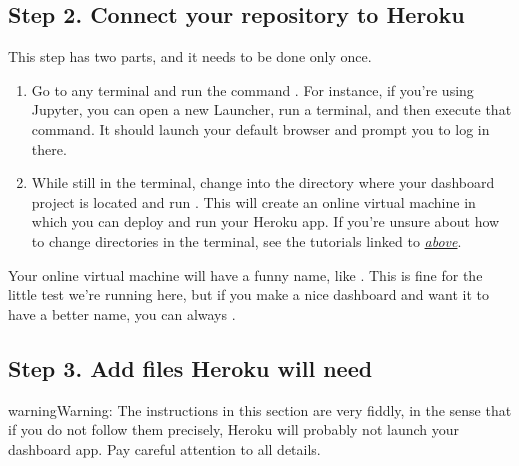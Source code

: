 \documentclass[letterpaper,10pt,english]{jupyterBook}
\begin{document}
\subsection{Step 2. Connect your repository to Heroku}
\label{\detokenize{chapter-14-dashboards:step-2-connect-your-repository-to-heroku}}
\sphinxAtStartPar
This step has two parts, and it needs to be done only once.
\begin{enumerate}
%
\item {} 
\sphinxAtStartPar
{}  Go to any terminal and run the command .  For instance, if you’re using Jupyter, you can open a new Launcher, run a terminal, and then execute that command.  It should launch your default browser and prompt you to log in there.

\item {} 
\sphinxAtStartPar
{}  While still in the terminal, change into the directory where your dashboard project is located and run .  This will create an online virtual machine in which you can deploy and run your Heroku app.  If you’re unsure about how to change directories in the terminal, see the tutorials linked to {\hyperref[\detokenize{chapter-14-dashboards:step-2-converting-your-script-to-use-streamlit}]{\emph{above}}}.

\end{enumerate}

\sphinxAtStartPar
Your online virtual machine will have a funny name, like .  This is fine for the little test we’re running here, but if you make a nice dashboard and want it to have a better name, you can always .


\subsection{Step 3. Add files Heroku will need}
\label{\detokenize{chapter-14-dashboards:step-3-add-files-heroku-will-need}}
\begin{sphinxadmonition}{warning}{Warning:}
\sphinxAtStartPar
The instructions in this section are very fiddly, in the sense that if you do not follow them precisely, Heroku will probably not launch your dashboard app.  Pay careful attention to all details.
\end{sphinxadmonition}
\end{document}
